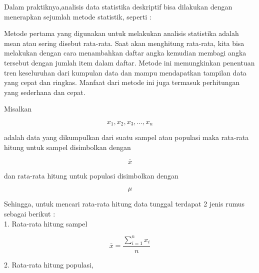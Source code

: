 \documentclass[a4paper,10pt]{article}
\begin{document}
\begin{eulernotebook}
\begin{eulercomment}
\begin{eulercomment}
\begin{eulercomment}
\begin{eulercomment}
\begin{eulercomment}
\begin{eulercomment}
\begin{eulercomment}
\begin{eulercomment}
\begin{eulercomment}
\begin{eulercomment}
\begin{eulercomment}
Dalam praktiknya,analisis data statistika deskriptif bisa dilakukan
dengan menerapkan sejumlah metode statistik, seperti :

\end{eulercomment}
\begin{eulercomment}
Metode pertama yang digunakan untuk melakukan analisis statistika
adalah mean atau sering disebut rata-rata. Saat akan menghitung
rata-rata, kita bisa melakukan dengan cara menambahkan daftar angka
kemudian membagi angka tersebut dengan jumlah item dalam daftar.
Metode ini memungkinkan penentuan tren keseluruhan dari kumpulan data
dan mampu mendapatkan tampilan data yang cepat dan ringkas. Manfaat
dari metode ini juga termasuk perhitungan yang sederhana dan cepat.

\end{eulercomment}
\begin{eulercomment}
Misalkan\\
\end{eulercomment}
\begin{eulerformula}
\[
x_1 , x_2 , x_3 ,..., x_n
\]
\end{eulerformula}
\begin{eulercomment}
adalah data yang dikumpulkan dari suatu sampel atau populasi maka
rata-rata hitung untuk sampel disimbolkan dengan\\
\end{eulercomment}
\begin{eulerformula}
\[
\bar{x}
\]
\end{eulerformula}
\begin{eulercomment}
dan rata-rata hitung untuk populasi disimbolkan dengan\\
\end{eulercomment}
\begin{eulerformula}
\[
\mu
\]
\end{eulerformula}
\begin{eulercomment}
Sehingga, untuk mencari rata-rata hitung data tunggal terdapat 2 jenis
rumus sebagai berikut :\\
1. Rata-rata hitung sampel\\
\end{eulercomment}
\begin{eulerformula}
\[
\bar{x}=\frac{\sum_{i=1}^{n} x_i}{n}
\]
\end{eulerformula}
\begin{eulercomment}
2. Rata-rata hitung populasi,\\

\end{eulercomment}
\end{eulercomment}
\end{eulercomment}
\end{eulercomment}
\end{eulercomment}
\end{eulercomment}
\end{eulercomment}
\end{eulercomment}
\end{eulercomment}
\end{eulercomment}
\end{eulercomment}
\end{eulernotebook}
\end{document}
